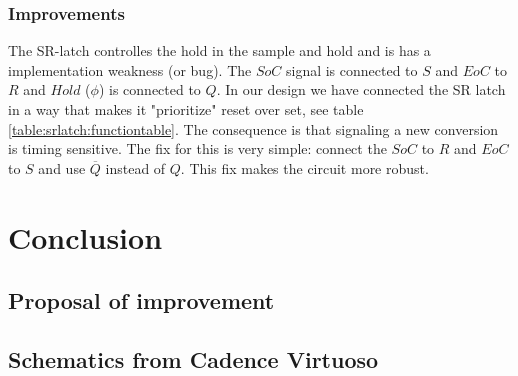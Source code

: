 \documentclass[english, 12pt, a4paper]{ifimaster}
\begin{document}
\subsection{Improvements}
The SR-latch controlles the hold in the sample and hold and is has a implementation weakness (or bug). The \(SoC\) signal is connected to \(S\) and \(EoC\) to  \(R\) and \(Hold\) (\(\phi\)) is connected to \(Q\). 
In our design we have connected the SR latch in a way that makes it "prioritize" reset over set, see table \ref{table:srlatch:functiontable}.
The consequence is that signaling a new conversion is timing sensitive.
The fix for this is very simple: connect the \(SoC\) to \(R\) and \(EoC\) to \(S\) and use \(\overline{Q}\) instead of \(Q\). This fix makes the circuit more robust.



\chapter{Conclusion}
\section{Proposal of improvement}


\begin{appendices}
\chapter{Schematics from Cadence Virtuoso}
\end{appendices}

\printbibliography{}
\end{document}
